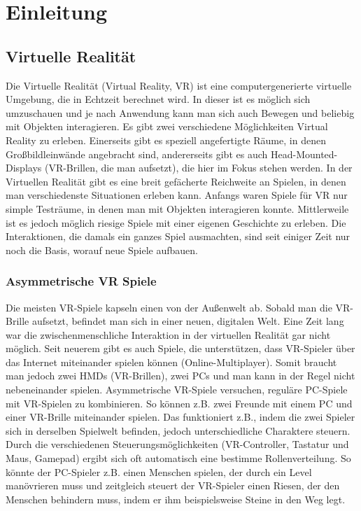 \chapter{Einleitung}

\section{Virtuelle Realität}
Die Virtuelle Realität (Virtual Reality, VR) ist eine computergenerierte virtuelle Umgebung, die in Echtzeit berechnet wird. In dieser ist es möglich sich umzuschauen und je nach Anwendung kann man sich auch Bewegen und beliebig mit Objekten interagieren. Es gibt zwei verschiedene Möglichkeiten Virtual Reality zu erleben. Einerseits gibt es speziell angefertigte Räume, in denen Großbildleinwände angebracht sind, andererseits gibt es auch Head-Mounted-Displays (VR-Brillen, die man aufsetzt), die hier im Fokus stehen werden. In der Virtuellen Realität gibt es eine breit gefächerte Reichweite an Spielen, in denen man verschiedenste Situationen erleben kann. Anfangs waren Spiele für VR nur simple Testräume, in denen man mit Objekten interagieren konnte. Mittlerweile ist es jedoch möglich riesige Spiele mit einer eigenen Geschichte zu erleben. Die Interaktionen, die damals ein ganzes Spiel ausmachten, sind seit einiger Zeit nur noch die Basis, worauf neue Spiele aufbauen.

\subsection{Asymmetrische VR Spiele}
Die meisten VR-Spiele kapseln einen von der Außenwelt ab. Sobald man die VR-Brille aufsetzt, befindet man sich in einer neuen, digitalen Welt. Eine Zeit lang war die zwischenmenschliche Interaktion in der virtuellen Realität gar nicht möglich. Seit neuerem gibt es auch Spiele, die unterstützen, dass VR-Spieler über das Internet miteinander spielen können (Online-Multiplayer). Somit braucht man jedoch zwei HMDs (VR-Brillen), zwei PCs und man kann in der Regel nicht nebeneinander spielen. Asymmetrische VR-Spiele versuchen, reguläre PC-Spiele mit VR-Spielen zu kombinieren. So können z.B. zwei Freunde mit einem PC und einer VR-Brille miteinander spielen. Das funktioniert z.B., indem die zwei Spieler sich in derselben Spielwelt befinden, jedoch unterschiedliche Charaktere steuern. Durch die verschiedenen Steuerungsmöglichkeiten (VR-Controller, Tastatur und Maus, Gamepad) ergibt sich oft automatisch eine bestimme Rollenverteilung. So könnte der PC-Spieler z.B. einen Menschen spielen, der durch ein Level manövrieren muss und zeitgleich steuert der VR-Spieler einen Riesen, der den Menschen behindern muss, indem er ihm beispielsweise Steine in den Weg legt.

